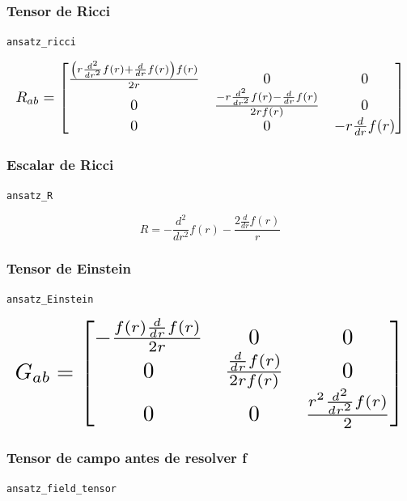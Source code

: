 \documentclass[11pt,a4paper]{article}
\begin{document}
\subsubsection{Tensor de Ricci}

\noindent\texttt{ansatz\_ricci}\par\nopagebreak[4]

\[
\resizebox{\textwidth}{!}{$\displaystyle R_{ab} = \left[\begin{matrix}\frac{\left(r \frac{d^{2}}{d r^{2}} f{\left(r \right)} + \frac{d}{d r} f{\left(r \right)}\right) f{\left(r \right)}}{2 r} & 0 & 0\\0 & \frac{- r \frac{d^{2}}{d r^{2}} f{\left(r \right)} - \frac{d}{d r} f{\left(r \right)}}{2 r f{\left(r \right)}} & 0\\0 & 0 & - r \frac{d}{d r} f{\left(r \right)}\end{matrix}\right]$}
\]

\subsubsection{Escalar de Ricci}

\noindent\texttt{ansatz\_R}\par\nopagebreak[4]

\[
R = - \frac{d^{2}}{d r^{2}} f{\left(r \right)} - \frac{2 \frac{d}{d r} f{\left(r \right)}}{r}
\]

\subsubsection{Tensor de Einstein}

\noindent\texttt{ansatz\_Einstein}\par\nopagebreak[4]

\[
\resizebox{\textwidth}{!}{$\displaystyle G_{ab} = \left[\begin{matrix}- \frac{f{\left(r \right)} \frac{d}{d r} f{\left(r \right)}}{2 r} & 0 & 0\\0 & \frac{\frac{d}{d r} f{\left(r \right)}}{2 r f{\left(r \right)}} & 0\\0 & 0 & \frac{r^{2} \frac{d^{2}}{d r^{2}} f{\left(r \right)}}{2}\end{matrix}\right]$}
\]

\subsubsection{Tensor de campo antes de resolver f}

\noindent\texttt{ansatz\_field\_tensor}\par\nopagebreak[4]
\end{document}
